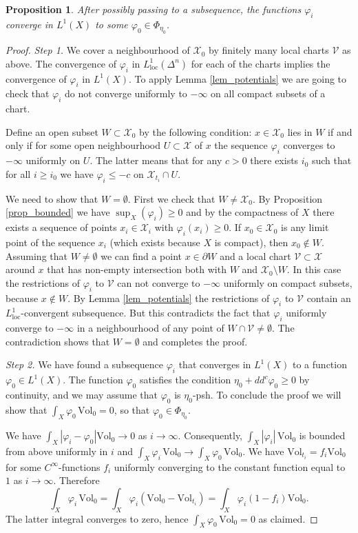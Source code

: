 \documentclass[11pt]{article}
\newcommand{\6}{\partial}
\newcommand{\VV}{\mathcal{V}}
\newcommand{\XX}{\mathcal{X}}
\renewcommand{\ge}{\geqslant}
\renewcommand{\le}{\leqslant}
\newcommand{\Vol}{\mathrm{Vol}}
\newtheorem{prop}[defn]{Proposition}
\begin{document}
\begin{prop}\label{prop_potentials}
After possibly passing to a subsequence, the functions $\varphi_i$ converge in $L^1(X)$ to some $\varphi_0\in\Phi_{\eta_0}$.
\end{prop}
\begin{proof}
{\em Step 1.} We cover a neighbourhood of $\XX_0$ by finitely many local charts $\VV$ as above.
The convergence of $\varphi_i$ in $L^1_{\mathrm{loc}}(\Delta^n)$ for each of the charts
implies the convergence of $\varphi_i$ in $L^1(X)$. To apply Lemma \ref{lem_potentials}
we are going to check that $\varphi_i$ do not converge uniformly to $-\infty$
on all compact subsets of a chart.

Define an open subset $W\subset \XX_0$ by the following condition: $x\in\XX_0$ lies in $W$
if and only if for some open neighbourhood $U\subset\XX$ of $x$ the sequence $\varphi_i$
converges to $-\infty$ uniformly on $U$. The latter means that for any $c>0$ there exists
$i_0$ such that for all $i\ge i_0$ we have $\varphi_i \le -c$ on $\XX_{t_i}\cap U$.

We need to show that $W=\emptyset$. First we check that $W\neq \XX_0$.
By Proposition \ref{prop_bounded} we have $\sup_X(\varphi_i)\ge 0$ and by the compactness of $X$
there exists a sequence of points $x_i\in\XX_i$ with $\varphi_i(x_i) \ge 0$. If
$x_0\in\XX_0$ is any limit point of the sequence $x_i$ (which exists because $X$ is compact),
then $x_0\notin W$. Assuming that $W\neq \emptyset$ we can find a point $x\in \partial W$ and
a local chart $\VV\subset \XX$ around $x$ that has non-empty intersection both 
with $W$ and $\XX_0\setminus W$.
In this case the restrictions of $\varphi_i$ to $\VV$ can not converge to $-\infty$ uniformly
on compact subsets, because $x\notin W$. By Lemma \ref{lem_potentials}
the restrictions of $\varphi_i$ to $\VV$ contain an $L^1_{\mathrm{loc}}$-convergent
subsequence. But this contradicts the fact that $\varphi_i$
uniformly converge to $-\infty$ in a neighbourhood of any point of $W\cap \VV\neq \emptyset$.
The contradiction shows that $W=\emptyset$ and completes the proof.

{\em Step 2.} We have found a subsequence $\varphi_i$ that converges in $L^1(X)$ to a function $\varphi_0\in L^1(X)$.
The function $\varphi_0$ satisfies the condition $\eta_0+dd^c\varphi_0\ge 0$ by continuity,
and we may assume that $\varphi_0$ is $\eta_0$-psh. To conclude the proof we will show
that $\int_X \varphi_0\,\Vol_0 = 0$, so that $\varphi_0\in\Phi_{\eta_0}$.

We have $\int_X|\varphi_i - \varphi_0|\Vol_0 \to 0$ as $i\to\infty$. Consequently, $\int_X|\varphi_i|\,\Vol_0$
is bounded from above uniformly in $i$ and $\int_X \varphi_i\, \Vol_0\to \int_X \varphi_0\, \Vol_0$.
We have $\Vol_{t_i} = f_i \Vol_0$ for some $C^\infty$-functions $f_i$ uniformly converging to
the constant function equal to $1$ as $i\to \infty$. Therefore
$$
\int_X\varphi_i\,\Vol_0 = \int_X\varphi_i(\Vol_0 - \Vol_{t_i}) = \int_X \varphi_i(1-f_i)\Vol_0.
$$
The latter integral converges to zero, hence $\int_X \varphi_0\, \Vol_0 = 0$ as claimed.
\end{proof}
\end{document}
